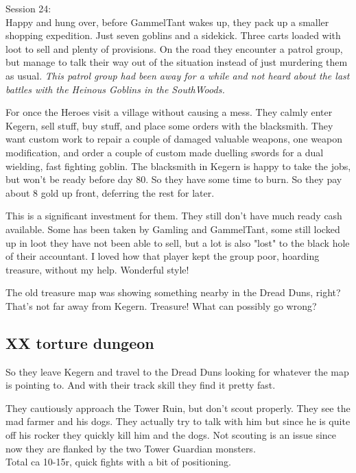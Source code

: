 \noindent Session 24:\\                                                 %
Happy and hung over, before GammelTant wakes up, they pack up a smaller shopping expedition. Just seven goblins and a sidekick. Three carts loaded with loot to sell and plenty of provisions. On the road they encounter a patrol group, but manage to talk their way out of the situation instead of just murdering them as usual. \emph{This patrol group had been away for a while and not heard about the last battles with the Heinous Goblins in the SouthWoods.}

For once the Heroes visit a village without causing a mess. They calmly enter Kegern, sell stuff, buy stuff, and place some orders with the blacksmith. They want custom work to repair a couple of damaged valuable weapons, one weapon modification, and order a couple of custom made duelling swords for a dual wielding, fast fighting goblin. The blacksmith in Kegern is happy to take the jobs, but won't be ready before day 80. So they have some time to burn. So they pay about 8 gold up front, deferring the rest for later.

\begin{readoutloud}
This is a significant investment for them. They still don't have much ready cash available. Some has been taken by Gamling and GammelTant, some still locked up in loot they have not been able to sell, but a lot is also "lost" to the black hole of their accountant. I loved how that player kept the group poor, hoarding treasure, without my help. Wonderful style!
\end{readoutloud}

The old treasure map was showing something nearby in the Dread Duns, right? That's not far away from Kegern. Treasure! What can possibly go wrong?


\subsection*{XX torture dungeon}

So they leave Kegern and travel to the Dread Duns looking for whatever the map is pointing to. And with their track skill they find it pretty fast.

They cautiously approach the Tower Ruin, but don't scout properly. They see the mad farmer and his dogs. They actually try to talk with him but since he is quite off his rocker they quickly kill him and the dogs. Not scouting is an issue since now they are flanked by the two Tower Guardian monsters. \\
Total ca 10-15r, quick fights with a bit of positioning. 

